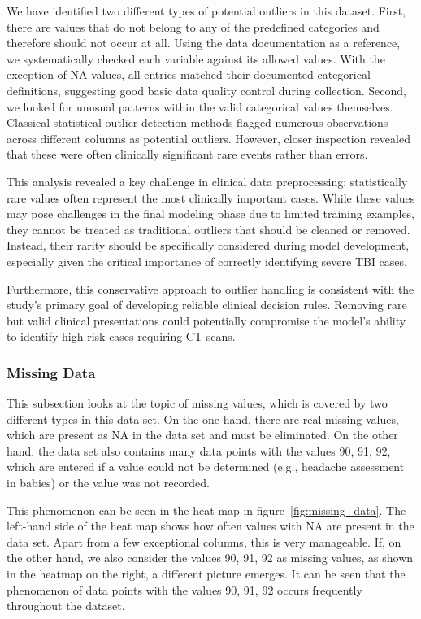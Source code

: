 \documentclass[10pt,letterpaper]{article}
\begin{document}
We have identified two different types of potential outliers in this dataset. First, there are values that do not belong to any of the predefined categories and therefore should not occur at all. Using the data documentation as a reference, we systematically checked each variable against its allowed values. With the exception of NA values, all entries matched their documented categorical definitions, suggesting good basic data quality control during collection. Second, we looked for unusual patterns within the valid categorical values themselves. Classical statistical outlier detection methods flagged numerous observations across different columns as potential outliers. However, closer inspection revealed that these were often clinically significant rare events rather than errors.

This analysis revealed a key challenge in clinical data preprocessing: statistically rare values often represent the most clinically important cases. While these values may pose challenges in the final modeling phase due to limited training examples, they cannot be treated as traditional outliers that should be cleaned or removed. Instead, their rarity should be specifically considered during model development, especially given the critical importance of correctly identifying severe TBI cases.

Furthermore, this conservative approach to outlier handling is consistent with the study's primary goal of developing reliable clinical decision rules. Removing rare but valid clinical presentations could potentially compromise the model's ability to identify high-risk cases requiring CT scans.

\subsubsection{Missing Data}
This subsection looks at the topic of missing values, which is covered by two different types in this data set. On the one hand, there are real missing values, which are present as NA in the data set and must be eliminated. On the other hand, the data set also contains many data points with the values 90, 91, 92, which are entered if a value could not be determined (e.g., headache assessment in babies) or the value was not recorded.

This phenomenon can be seen in the heat map in figure~\ref{fig:missing_data}. The left-hand side of the heat map shows how often values with NA are present in the data set. Apart from a few exceptional columns, this is very manageable. If, on the other hand, we also consider the values 90, 91, 92 as missing values, as shown in the heatmap on the right, a different picture emerges. It can be seen that the phenomenon of data points with the values 90, 91, 92 occurs frequently throughout the dataset.
\end{document}
